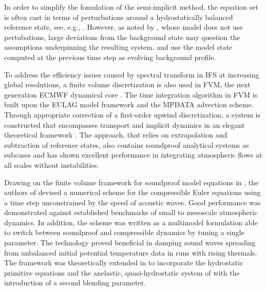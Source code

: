 \documentclass{ametsoc}
\theoremstyle{definition}
\begin{document}
In order to simplify the fomulation of the semi-implicit method, the equation set is often cast in terms of perturbations around a hydrostatically balanced reference state, see, e.g., \cite{RestelliGiraldo2009,SmolarkiewiczEtAl2014,SmolarkiewiczEtAl2019}. However, as noted by \cite{WellerShahrokhi2014}, whose model does not use pertubations, large deviations from the background state may question the assumptions underpinning the resulting system. \cite{WoodEtAl2013} and \cite{MelvinEtAl2018} use the model state computed at the previous time step as evolving background profile.

To address the efficiency issues caused by spectral transform in IFS at increasing global resolutions, a finite volume discretization is also used in FVM, the next generation ECMWF dynamical core \citep{KuehnleinEtAl2018}. The time integration algorithm in FVM is built upon the EULAG model framework and the MPDATA advection scheme. Through appropriate correction of a first-order upwind discretization, a system is constructed that encompasses transport and implicit dynamics in an elegant theoretical framework \citep[and references therein]{SmolarkiewiczEtAl2014, SmolarkiewiczEtAl2016}. The approach, that relies on extrapolation and subtraction of reference states, also contains soundproof analytical systems as subcases and has shown excellent performance in integrating atmospheric flows at all scales without instabilities.

Drawing on the finite volume framework for soundproof model equations in \cite{KleinTCFD2009}, the authors of \cite{Benacchio2014, BenacchioEtAl2014} devised a numerical scheme for the compressible Euler equations using a time step unconstrained by the speed of acoustic waves. Good performance was demonstrated against established benchmarks of small to mesoscale atmospheric dynamics. In addition, the scheme was written as a multimodel formulation able to switch between soundproof and compressible dynamics by tuning a single parameter. The technology proved beneficial in damping sound waves spreading from unbalanced initial potential temperature data in runs with rising thermals. The framework was theoretically extended in  \cite{KleinBenacchio2016} to incorporate the hydrostatic primitive equations and the anelastic, quasi-hydrostatic system of \cite{ArakawaKonor2009} with the introduction of a second blending parameter.
\end{document}
